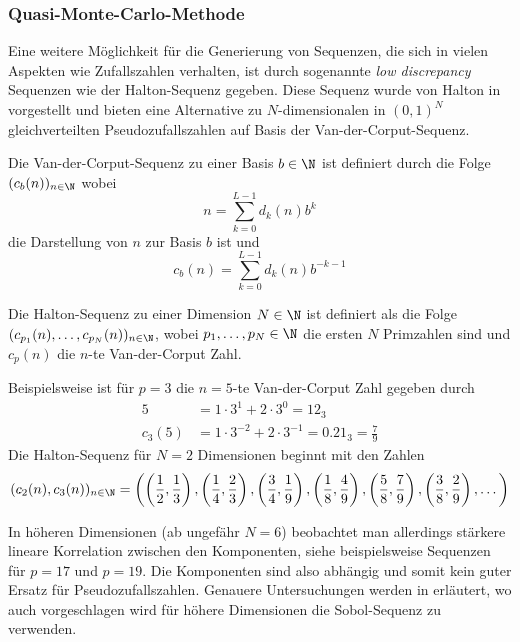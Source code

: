 \subsubsection*{Quasi-Monte-Carlo-Methode}
Eine weitere Möglichkeit für die Generierung von Sequenzen, die sich in vielen Aspekten wie Zufallszahlen verhalten, ist durch sogenannte \emph{low discrepancy} Sequenzen wie der Halton-Sequenz gegeben. Diese Sequenz wurde von Halton in \autocite{halton60} vorgestellt und bieten eine Alternative zu $N$-dimensionalen in $(0,1)^N$ gleichverteilten Pseudozufallszahlen auf Basis der Van-der-Corput-Sequenz.\\
\begin{mathdef}
Die Van-der-Corput-Sequenz zu einer Basis $b\in\N$ ist definiert durch die Folge $(c_b(n))_{n\in\N}$ wobei
\begin{equation*}
n=\sum_{k=0}^{L-1}d_k(n)b^k
\end{equation*}
die Darstellung von $n$ zur Basis $b$ ist und
\begin{equation*}
c_b(n)=\sum_{k=0}^{L-1}d_k(n)b^{-k-1}
\end{equation*}
\end{mathdef}
\begin{mathdef}
Die Halton-Sequenz zu einer Dimension $N\in\N$ ist definiert als die Folge $(c_{p_1}(n),\dots,c_{p_N}(n))_{n\in\N}$, wobei $p_1,\dots,p_N\in\N$ die ersten $N$ Primzahlen sind und $c_p(n)$ die $n$-te Van-der-Corput Zahl.
\end{mathdef}
\begin{mathbsp}
Beispielsweise ist für $p=3$ die $n=5$-te Van-der-Corput Zahl gegeben durch 
\begin{align*}
5&=1\cdot 3^1+2\cdot 3^0=12_3\\
c_3(5)&=1\cdot 3^{-2}+2\cdot 3^{-1}=0.21_3=\frac{7}{9}
\end{align*}
Die Halton-Sequenz für $N=2$ Dimensionen beginnt mit den Zahlen
\begin{equation*}
(c_2(n),c_3(n))_{n\in\N}=\left(\left(\frac{1}{2},\frac{1}{3}\right),\left(\frac{1}{4},\frac{2}{3}\right),\left(\frac{3}{4},\frac{1}{9}\right),\left(\frac{1}{8},\frac{4}{9}\right),\left(\frac{5}{8},\frac{7}{9}\right),\left(\frac{3}{8},\frac{2}{9}\right),\dots\right)
\end{equation*}
\end{mathbsp}
In höheren Dimensionen (ab ungefähr $N=6$) beobachtet man allerdings stärkere lineare Korrelation zwischen den Komponenten, siehe beispielsweise Sequenzen für $p=17$ und $p=19$. Die Komponenten sind also abhängig und somit kein guter Ersatz für Pseudozufallszahlen. Genauere Untersuchungen werden in \autocite{Morokoff1995218} erläutert, wo auch vorgeschlagen wird für höhere Dimensionen die Sobol-Sequenz zu verwenden.\\
